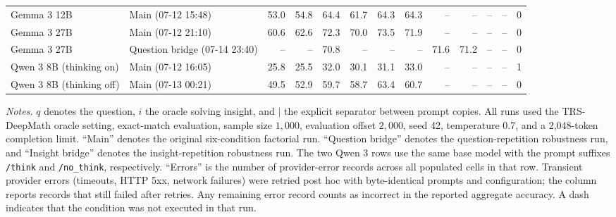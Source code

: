 \begin{table}[t]
{\begin{tabular}{@{}llrrrrrrrrrrr@{}}
      \addlinespace[2pt]
      Gemma 3 12B
        & Main (07-12 15:48)
        & 53.0 & 54.8 & 64.4 & 61.7 & 64.3 & 64.3 & -- & -- & -- & -- & 0 \\
      \addlinespace[2pt]
      Gemma 3 27B
        & Main (07-12 21:10)
        & 60.6 & 62.6 & 72.3 & 70.0 & 73.5 & 71.9 & -- & -- & -- & -- & 0 \\
      Gemma 3 27B
        & Question bridge (07-14 23:40)
        & -- & -- & 70.8 & -- & -- & -- & 71.6 & 71.2 & -- & -- & 0 \\
      \addlinespace[2pt]
      Qwen 3 8B (thinking on)
        & Main (07-12 16:05)
        & 25.8 & 25.5 & 32.0 & 30.1 & 31.1 & 33.0 & -- & -- & -- & -- & 1 \\
      Qwen 3 8B (thinking off)
        & Main (07-13 00:21)
        & 49.5 & 52.9 & 59.7 & 58.7 & 63.4 & 60.7 & -- & -- & -- & -- & 0 \\
      \bottomrule
    \end{tabular}%
  }
  \vspace{2pt}

  \begin{minipage}{\textwidth}
    \footnotesize
    \textit{Notes.}
    $q$ denotes the question, $i$ the oracle solving insight, and $\mid$ the explicit separator between prompt copies.
    All runs used the TRS-DeepMath oracle setting, exact-match evaluation, sample size $1{,}000$, evaluation offset $2{,}000$, seed 42, temperature 0.7, and a 2,048-token completion limit.
    ``Main'' denotes the original six-condition factorial run. ``Question bridge'' denotes the question-repetition robustness run, and ``Insight bridge'' denotes the insight-repetition robustness run.
    The two Qwen 3 rows use the same base model with the prompt suffixes \texttt{/think} and \texttt{/no\_think}, respectively.
    ``Errors'' is the number of provider-error records across all populated cells in that row. Transient provider errors (timeouts, HTTP 5xx, network failures) were retried post hoc with byte-identical prompts and configuration; the column reports records that still failed after retries. Any remaining error record counts as incorrect in the reported aggregate accuracy. A dash indicates that the condition was not executed in that run.
  \end{minipage}
\end{table}

